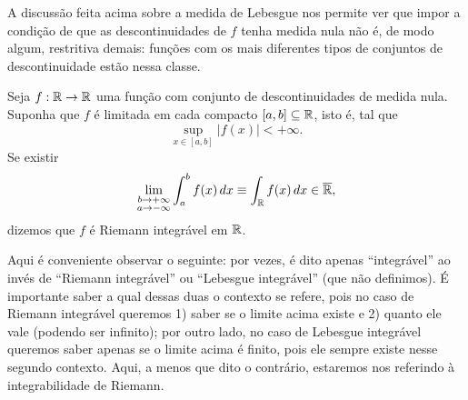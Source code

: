         A discussão feita acima sobre a medida de Lebesgue nos permite ver que impor a condição
        de que as descontinuidades de $f$ tenha medida nula não é, de modo algum, restritiva demais:
        funções com os mais diferentes tipos de conjuntos de descontinuidade estão nessa classe.
        \begin{definicao}
        \label{def-riemann-integravel}
            Seja $f:\mathbb{R}\to\mathbb{R}$ uma função com conjunto de descontinuidades de medida nula. Suponha
            que $f$ é limitada em cada compacto $[a,b]\subseteq\mathbb{R}$, isto é, tal que
            \begin{equation*}
                \sup_{x\in [a,b]} |f(x)| < +\infty.
            \end{equation*}
            Se existir
            \begin{equation*}
                \lim_{\substack{b\to +\infty \\ a\to -\infty}} \int_a^b f(x) \, dx 
                \equiv \int_{\mathbb{R}} f(x) \, dx \in\overline{\mathbb{R}},
            \end{equation*}
            dizemos que $f$ é Riemann integrável em $\mathbb{R}$.
        \end{definicao}
        Aqui é conveniente observar o seguinte: por vezes, é dito apenas ``integrável'' ao invés
        de ``Riemann integrável'' ou ``Lebesgue integrável'' (que não definimos). É importante
        saber a qual dessas duas o contexto se refere, pois no caso de Riemann integrável queremos
        1) saber se o limite acima existe e 2) quanto ele vale (podendo ser infinito); por outro
        lado, no caso de Lebesgue integrável queremos saber apenas se o limite acima é finito,
        pois ele sempre existe nesse segundo contexto. Aqui, a menos que dito o contrário,
        estaremos nos referindo à integrabilidade de Riemann.
        
